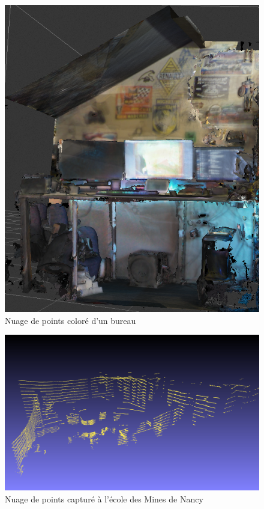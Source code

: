 \begin{figure}[ht]
    \centering
    \includegraphics[width=15cm]{images/kinect_avec_couleur.png}
    \caption{Nuage de points coloré d'un bureau}
    \label{fig:kinect_2}
\end{figure}

\begin{figure}[h]
    \centering
    \includegraphics[width=15cm]{images/lidar.png}
    \caption{Nuage de points capturé à l'école des Mines de Nancy}
    \label{fig:lidar}
\end{figure}

